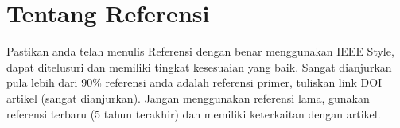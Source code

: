 \documentclass[
 manuscript=article,  %
  layout=publish, 
  year=2024, 
  month= Februari, %
  volume=8,
  number=1 
]{JIKO}
\begin{document}
\section*{Tentang Referensi}
Pastikan anda telah menulis Referensi dengan benar menggunakan IEEE Style, dapat ditelusuri dan memiliki tingkat kesesuaian yang baik. Sangat dianjurkan pula lebih dari 90\% referensi anda adalah referensi primer, tuliskan link DOI artikel (sangat dianjurkan). Jangan menggunakan referensi lama, gunakan referensi terbaru (5 tahun terakhir) dan memiliki keterkaitan dengan artikel.

\renewcommand{\refname}{Pustaka} %
	


\end{document}
